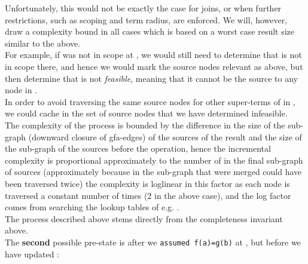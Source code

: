 Unfortunately, this would not be exactly the case for joins, or when further restrictions, such as scoping and term radius, are enforced. We will, however, draw a complexity bound in all cases which is based on a worst case result size similar to the above.\\
For example, if  was not in scope at , we would still need to determine that  is not in scope there, and hence we would mark the source nodes relevant as above, 
but then determine that  is not \emph{feasible}, 
meaning that it cannot be the source to any node in .\\
In order to avoid traversing the same source nodes for other super-terms of  in ,
we could cache in  the set of source nodes that we have determined infeasible.\\
The complexity of the process is bounded by the difference in the size of the sub-graph (downward closure of gfa-edges) of the sources of the result and the size of the sub-graph of the sources
before the operation, hence the incremental complexity is proportional approximately to the number of \GFAs{} in the final sub-graph of sources (approximately because \GFAs{} in the sub-graph that were merged could have been traversed twice) the complexity is loglinear in this factor as each node is traversed a constant number of times (2 in the above case), and the log factor comes from searching the lookup tables of e.g. \GFAs{}.\\
The process described above stems directly from the \GFA{} completeness invariant above.\\
\noindent
The \textbf{second} possible pre-state is after we \lstinline{assumed f(a)=g(b)} at , but before we have updated :
